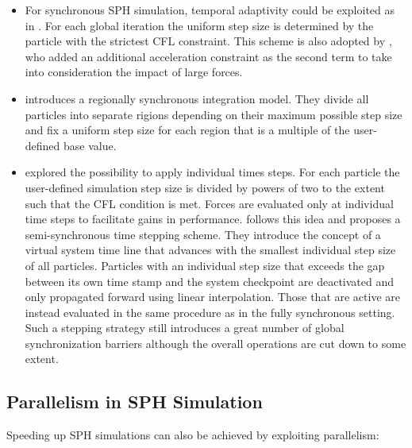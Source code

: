 \documentclass[
	11pt, 
	DIV10,
	ngerman,
	a4paper, 
	oneside, 
	headings=normal, 
	captions=tableheading,
	final, 
	numbers=noenddot
]{scrartcl}
\begin{document}
\begin{itemize}
    \item For synchronous SPH simulation, temporal adaptivity could be exploited as in \cite{desbrun1996smoothed}. For each global iteration the uniform step size is determined by the particle with the strictest CFL constraint. This scheme is also adopted by \cite{bender2010boundary}, who added an additional acceleration constraint as the second term to take into consideration the impact of large forces.
    \item \cite{goswami2014regional} introduces a regionally synchronous integration model. They divide all particles into separate rigions depending on their maximum possible step size and fix a uniform step size for each region that is a multiple of the user-defined base value.
    \item \cite{desbrun1996smoothed} explored the possibility to apply individual times steps. For each particle the user-defined simulation step size is divided by powers of two to the extent such that the CFL condition is met. Forces are evaluated only at individual time steps to facilitate gains in performance. \cite{ban2018adaptively} follows this idea and proposes a semi-synchronous time stepping scheme. They introduce the concept of a virtual system time line that advances with the smallest individual step size of all particles. Particles with an individual step size that exceeds the gap between its own time stamp and the system checkpoint are deactivated and only propagated forward using linear interpolation. Those that are active are instead evaluated in the same procedure as in the fully synchronous setting. Such a stepping strategy still introduces a great number of global synchronization barriers although the overall operations are cut down to some extent.
\end{itemize}

\subsection{Parallelism in SPH Simulation}

Speeding up SPH simulations can also be achieved by exploiting parallelism:
\end{document}
